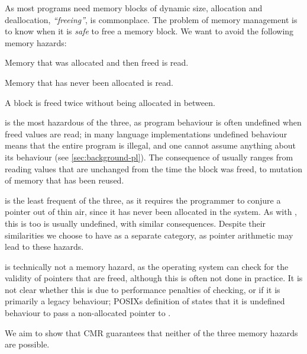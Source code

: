 As most programs need memory blocks of dynamic size, allocation and deallocation,
\emph{``freeing''}, is commonplace. The problem of memory management is to know when it is
\emph{safe} to free a memory block. We want to avoid the following memory hazards:

\begin{definition}
  Memory that was allocated and then freed is read.
\end{definition}

\begin{definition}
  Memory that has never been allocated is read.
\end{definition}

\begin{definition}
  A block is freed twice without being allocated in between.
\end{definition}


 is the most hazardous of the three, as program behaviour is often undefined
when freed values are read; in many language implementations undefined behaviour means that the
entire program is illegal, and one cannot assume anything about its behaviour (see
\cref{sec:background-pl}). The consequence of  usually ranges from reading
values that are unchanged from the time the block was freed, to mutation of memory that has been
reused.

 is the least frequent of the three, as it requires the programmer to conjure a
pointer out of thin air, since it has never been allocated in the system. As with
, this is too is usually undefined, with similar consequences. Despite their
similarities we choose to have  as a separate category, as pointer arithmetic
may lead to these hazards.

 is technically not a memory hazard, as the operating system can check for the
validity of pointers that are freed, although this is often not done in practice. It is not clear
whether this is due to performance penalties of checking, or if it is primarily a legacy
behaviour; POSIXs definition of  states that it is undefined behaviour to pass a
non-allocated pointer to \cite{posix}.

We aim to show that CMR guarantees that neither of the three memory hazards are possible.


